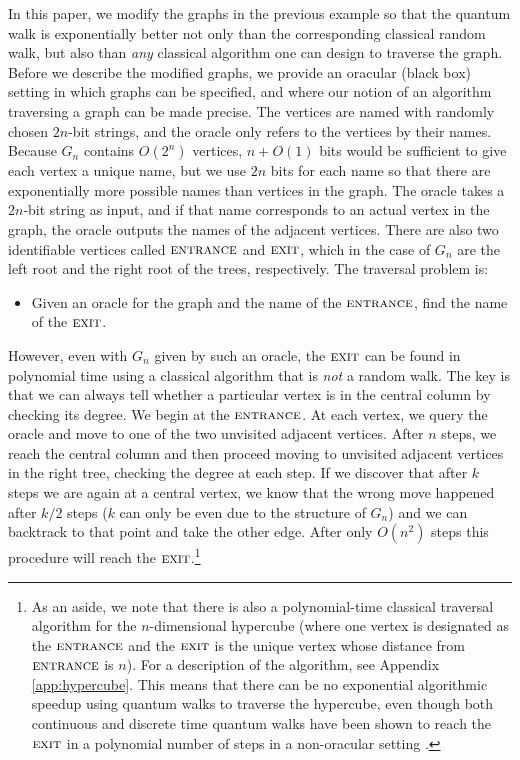 \documentclass[aps,11pt,twoside,nofootinbib,tightenlines,superscriptaddress,preprintnumbers]{revtex4}
\newcommand{\<}{\langle}
\renewcommand{\>}{\rangle}
\newcommand{\ent}{{\textsc{entrance}}}
\newcommand{\exit}{{\textsc{exit}}}
\begin{document}
In this paper, we modify the graphs in the previous example so that the
quantum walk is exponentially better not only than the corresponding
classical random walk, but also than {\em any} classical algorithm one can
design to traverse the graph.
%
Before we describe the modified graphs, we provide an oracular (black box)
setting in which graphs can be specified, and where our notion of an
algorithm traversing a graph can be made precise.  The vertices are
named with randomly chosen $2n$-bit strings, and the oracle only refers to
the vertices by their names.  Because $G_n$ contains $O(2^n)$ vertices,
$n+O(1)$ bits would be sufficient to give each vertex a unique name, but
we use $2n$ bits for each name so that there are exponentially more
possible names than vertices in the graph.  The oracle takes a $2n$-bit
string as input, and if that name corresponds to an actual vertex in the
graph, the oracle outputs the names of the adjacent vertices.  There are
also two identifiable vertices called $\ent$ and $\exit$, which in the
case of $G_n$ are the left root and the right root of the trees,
respectively.  The traversal problem is:
%
\begin{itemize}
\item Given an oracle for the graph and the name of the $\ent$, find the
name of the $\exit$.
\end{itemize}

However, even with $G_n$ given by such an oracle, the $\exit$ can be found
in polynomial time using a classical algorithm that is {\em not} a random
walk.  The key is that we can always tell whether a particular vertex is
in the central column by checking its degree.  We begin at the $\ent$.  At
each vertex, we query the oracle and move to one of the two unvisited
adjacent vertices.  After $n$ steps, we reach the central column and then
proceed moving to unvisited adjacent vertices in the right tree, checking
the degree at each step.  If we discover that after $k$ steps we are again
at a central vertex, we know that the wrong move happened after $k/2$
steps ($k$ can only be even due to the structure of $G_n$) and we can
backtrack to that point and take the other edge.  After only $O(n^2)$
steps this procedure will reach the $\exit$.\footnote{As an aside, we note
that there is also a polynomial-time classical traversal algorithm for the
$n$-dimensional hypercube (where one vertex is designated as the $\ent$
and the $\exit$ is the unique vertex whose distance from $\ent$ is $n$).
For a description of the algorithm, see Appendix \ref{app:hypercube}.
This means that there can be no exponential algorithmic speedup using
quantum walks to traverse the hypercube, even though both continuous and
discrete time quantum walks have been shown to reach the $\exit$ in a
polynomial number of steps in a non-oracular setting \cite{MR01,Kem02}.}
\end{document}
